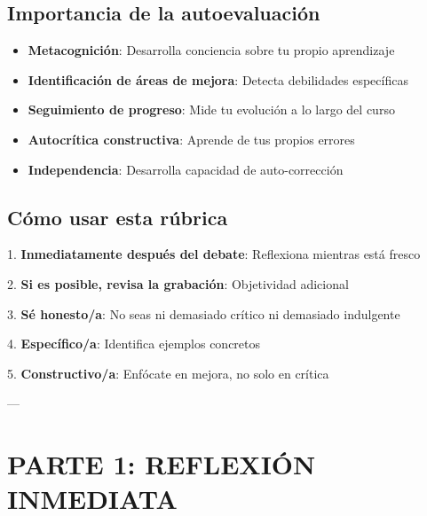 \documentclass[a4paper,11pt]{article}
\begin{document}
\vspace{0.2cm}

\subsection{Importancia de la autoevaluación}

\begin{itemize}

  \item \textbf{Metacognición}: Desarrolla conciencia sobre tu propio aprendizaje

  \item \textbf{Identificación de áreas de mejora}: Detecta debilidades específicas

  \item \textbf{Seguimiento de progreso}: Mide tu evolución a lo largo del curso

  \item \textbf{Autocrítica constructiva}: Aprende de tus propios errores

  \item \textbf{Independencia}: Desarrolla capacidad de auto-corrección

\end{itemize}

\vspace{0.2cm}

\subsection{Cómo usar esta rúbrica}

1. \textbf{Inmediatamente después del debate}: Reflexiona mientras está fresco

2. \textbf{Si es posible, revisa la grabación}: Objetividad adicional

3. \textbf{Sé honesto/a}: No seas ni demasiado crítico ni demasiado indulgente

4. \textbf{Específico/a}: Identifica ejemplos concretos

5. \textbf{Constructivo/a}: Enfócate en mejora, no solo en crítica

\vspace{0.2cm}

---

\vspace{0.2cm}

\section{PARTE 1: REFLEXIÓN INMEDIATA}
\end{document}
